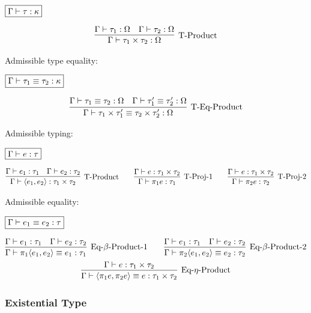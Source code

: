$\fbox{$\Gamma \vdash \tau: \kappa$}$

\begin{gather*}
  \infer[\text{T-Product}]{\Gamma \vdash \tau_1 \times \tau_2: \Omega}{
    \Gamma \vdash \tau_1: \Omega
    &
    \Gamma \vdash \tau_2: \Omega
  }
\end{gather*}

Admissible type equality:

$\fbox{$\Gamma \vdash \tau_1 \equiv \tau_2: \kappa$}$

\begin{gather*}
  \infer[\text{T-Eq-Product}]{\Gamma \vdash \tau_1 \times \tau'_1 \equiv \tau_2 \times \tau'_2: \Omega}{
    \Gamma \vdash \tau_1 \equiv \tau_2: \Omega
    &
    \Gamma \vdash \tau'_1 \equiv \tau'_2: \Omega
  }
\end{gather*}

Admissible typing:

$\fbox{$\Gamma \vdash e: \tau$}$

\begin{gather*}
  \infer[\text{T-Product}]{\Gamma \vdash \langle e_1, e_2\rangle: \tau_1 \times \tau_2}{
    \Gamma \vdash e_1: \tau_1
    &
    \Gamma \vdash e_2: \tau_2
  }
  \hspace{2em}
  \infer[\text{T-Proj-1}]{\Gamma \vdash \pi_1 e: \tau_1}{
    \Gamma \vdash e: \tau_1 \times \tau_2
  }
  \hspace{2em}
  \infer[\text{T-Proj-2}]{\Gamma \vdash \pi_2 e: \tau_2}{
    \Gamma \vdash e: \tau_1 \times \tau_2
  }
\end{gather*}

Admissible equality:

$\fbox{$\Gamma \vdash e_1 \equiv e_2: \tau$}$

\begin{gather*}
  \infer[\text{Eq-$\beta$-Product-1}]{\Gamma \vdash \pi_1 \langle e_1, e_2\rangle \equiv e_1: \tau_1}{
    \Gamma \vdash e_1: \tau_1
    &
    \Gamma \vdash e_2: \tau_2
  }
  \hspace{2em}
  \infer[\text{Eq-$\beta$-Product-2}]{\Gamma \vdash \pi_2 \langle e_1, e_2\rangle \equiv e_2: \tau_2}{
    \Gamma \vdash e_1: \tau_1
    &
    \Gamma \vdash e_2: \tau_2
  }
  \\
  \infer[\text{Eq-$\eta$-Product}]{\Gamma \vdash \langle \pi_1 e, \pi_2 e\rangle \equiv e: \tau_1 \times \tau_2}{
    \Gamma \vdash e: \tau_1 \times \tau_2
  }
\end{gather*}

\subsubsection{Existential Type}

